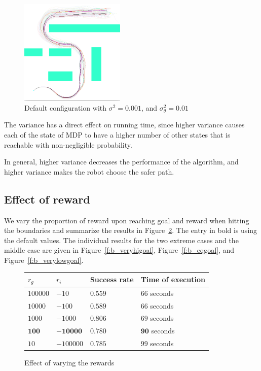 \documentclass[a4paper]{article}
\begin{document}
\begin{figure}
\caption{Default configuration with $\sigma^2=0.001$, and $\sigma_\theta^2=0.01$}
\label{f:b_verylowvar}
\centerline{\includegraphics[width=5cm]{b_verylowvar.png}}
\end{figure}


The variance has a direct effect on running time, since higher variance
causes each of the state of MDP to have a higher number of other states
that is reachable with non-negligible probability.

In general, higher variance decreases the performance of the algorithm,
and higher variance makes the robot choose the safer path.

\subsection{Effect of reward}

We vary the proportion of reward upon reaching goal and reward when hitting the
boundaries and summarize the results in
Figure~\ref{f:reward}. The entry in bold is using the default values.
The individual results for the two extreme cases and the middle case are given
in Figure~\ref{f:b_veryhigoal}, Figure~\ref{f:b_eqgoal},
and Figure~\ref{f:b_verylowgoal}.

\begin{figure}
\caption{Effect of varying the rewards}
\label{f:reward}
\begin{tabular}{ l | l | l | l }
  $r_g$ & $r_i$ & Success rate & Time of execution \\ \hline \hline
  $100000$ & $-10$ & $0.559$ & $66$ seconds \\ \hline  %
  $10000$ & $-100$ & $0.589$ & $66$ seconds \\ \hline  %
  $1000 $ & $-1000$ & $0.806$ & $69$ seconds \\ \hline  %
  $\mathbf{100}$ & $\mathbf{-10000}$ & $\mathbf{0.780}$ & $\mathbf{90}$ seconds \\ \hline
  $10$ & $-100000$ & $0.785$ & $99$ seconds \\ \hline  %
\end{tabular}
\end{figure}
\end{document}
